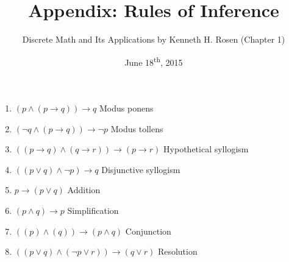 \documentclass[a4paper,8pt]{article}
\title{Appendix: Rules of Inference}
\author{Discrete Math and Its Applications by Kenneth H. Rosen (Chapter 1)}
\date{June 18\textsuperscript{th}, 2015}
\begin{document}
\maketitle
{}

\begin{outline}

    \begin{enumerate}
      \item \((p \wedge (p \rightarrow q)) \rightarrow q\) \hfill Modus ponens
      \item \((\neg q \wedge (p \rightarrow q)) \rightarrow \neg p\) \hfill Modus tollens
      \item \(((p \rightarrow q) \wedge (q \rightarrow r)) \rightarrow (p \rightarrow r)\) \hfill Hypothetical syllogism
      \item \(((p \vee q) \wedge \neg p) \rightarrow q\) \hfill Disjunctive syllogism
      \item \(p \rightarrow (p \vee q)\) \hfill Addition
      \item \((p \wedge q) \rightarrow p\) \hfill Simplification
      \item \(((p) \wedge (q)) \rightarrow (p \wedge q)\) \hfill Conjunction
      \item \(((p \vee q) \wedge (\neg p \vee r)) \rightarrow (q \vee r)\) \hfill Resolution
    \end{enumerate}

\end{outline}
\end{document}
